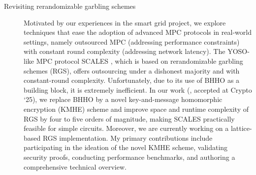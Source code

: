 \documentclass{article}
\begin{document}
\begin{description}
    \item[Revisiting rerandomizable garbling schemes] Motivated by our experiences in the smart grid project, we explore techniques that ease the adoption of advanced MPC protocols in real-world settings, namely outsourced MPC (addressing performance constraints) with constant round complexity (addressing network latency). The YOSO-like MPC protocol SCALES \cite{AcharyaHKP22}, which is based on rerandomizable garbling schemes (RGS), offers outsourcing under a dishonest majority and with constant-round complexity. Unfortunately, due to its use of BHHO \cite{BonehHHO08} as a building block, it is extremely inefficient. In our work (\cite{HHJ25}, accepted at Crypto ‘25), we replace BHHO by a novel key-and-message homomorphic encryption (KMHE) scheme and improve space and runtime complexity of RGS by four to five orders of magnitude, making SCALES practically feasible for simple circuits. Moreover, we are currently working on a lattice-based RGS implementation. My primary contributions include participating in the ideation of the novel KMHE scheme, validating security proofs, conducting performance benchmarks, and authoring a comprehensive technical overview.
\end{description}
\end{document}
